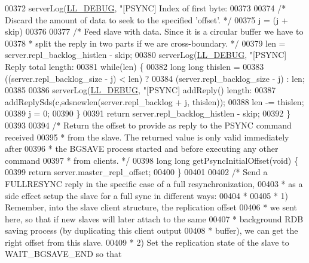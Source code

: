 \begin{DoxyCode}
{{{{{{{{{{{{{{{{00372     serverLog(\hyperlink{server_8h_abcaffe365dee628fcf9fc90c69d534a1}{LL\_DEBUG}, \textcolor{stringliteral}{"[PSYNC] Index of first byte: %
00373 
00374     \textcolor{comment}{/* Discard the amount of data to seek to the specified 'offset'. */}
00375     j = (j + skip) %
00376 
00377     \textcolor{comment}{/* Feed slave with data. Since it is a circular buffer we have to}
00378 \textcolor{comment}{     * split the reply in two parts if we are cross-boundary. */}
00379     len = server.repl\_backlog\_histlen - skip;
00380     serverLog(\hyperlink{server_8h_abcaffe365dee628fcf9fc90c69d534a1}{LL\_DEBUG}, \textcolor{stringliteral}{"[PSYNC] Reply total length: %
00381     \textcolor{keywordflow}{while}(len) \{
00382         \textcolor{keywordtype}{long} \textcolor{keywordtype}{long} thislen =
00383             ((server.repl\_backlog\_size - j) < len) ?
00384             (server.repl\_backlog\_size - j) : len;
00385 
00386         serverLog(\hyperlink{server_8h_abcaffe365dee628fcf9fc90c69d534a1}{LL\_DEBUG}, \textcolor{stringliteral}{"[PSYNC] addReply() length: %
00387         addReplySds(c,sdsnewlen(server.repl\_backlog + j, thislen));
00388         len -= thislen;
00389         j = 0;
00390     \}
00391     \textcolor{keywordflow}{return} server.repl\_backlog\_histlen - skip;
00392 \}
00393 
00394 \textcolor{comment}{/* Return the offset to provide as reply to the PSYNC command received}
00395 \textcolor{comment}{ * from the slave. The returned value is only valid immediately after}
00396 \textcolor{comment}{ * the BGSAVE process started and before executing any other command}
00397 \textcolor{comment}{ * from clients. */}
00398 \textcolor{keywordtype}{long} \textcolor{keywordtype}{long} getPsyncInitialOffset(\textcolor{keywordtype}{void}) \{
00399     \textcolor{keywordflow}{return} server.master\_repl\_offset;
00400 \}
00401 
00402 \textcolor{comment}{/* Send a FULLRESYNC reply in the specific case of a full resynchronization,}
00403 \textcolor{comment}{ * as a side effect setup the slave for a full sync in different ways:}
00404 \textcolor{comment}{ *}
00405 \textcolor{comment}{ * 1) Remember, into the slave client structure, the replication offset}
00406 \textcolor{comment}{ *    we sent here, so that if new slaves will later attach to the same}
00407 \textcolor{comment}{ *    background RDB saving process (by duplicating this client output}
00408 \textcolor{comment}{ *    buffer), we can get the right offset from this slave.}
00409 \textcolor{comment}{ * 2) Set the replication state of the slave to WAIT\_BGSAVE\_END so that}
}}}}}}}}}}}}}}}}}}}
\end{DoxyCode}
